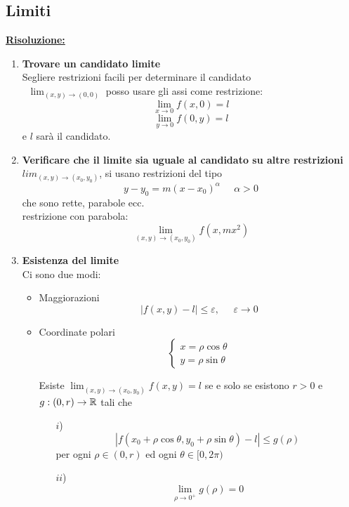 \subsection{Limiti}
\underline{\textbf{Risoluzione:}}
\begin{enumerate}
    \item \textbf{Trovare un candidato limite} \\
    Segliere restrizioni facili per determinare il candidato\\
    \es $\mspace{10mu} \lim_{(x,y) \to (0,0)}$ posso usare gli assi come restrizione:
    \[ \lim_{x \to 0} f(x,0) = l \] \[ \lim_{y \to 0} f(0, y) = l \]
    e $l$ sarà il candidato.

    \item \textbf{Verificare che il limite sia uguale al candidato su altre restrizioni}\\
    $lim_{(x,y) \to (x_0, y_0)}$, si usano restrizioni del tipo
    \[ y-y_0 = m(x-x_0)^\alpha \mspace{25mu} \alpha > 0\]
    che sono rette, parabole ecc.\\
    \es \space restrizione con parabola:
    \[ \lim_{(x,y) \to (x_0, y_0)} f(x, mx^2) \]

    \item \textbf{Esistenza del limite}\\
    Ci sono due modi:
    \begin{itemize}
        \item Maggiorazioni
        \[ |f(x, y) - l| \leq \varepsilon, \mspace{25mu} \varepsilon \to 0 \]
        \item Coordinate polari
        \[ \begin{cases}
            x = \rho \cos\theta \\
            y = \rho \sin\theta
        \end{cases}\]
        \begin{theorem}
            Esiste $\lim_{(x,y) \to (x_0, y_0)} f(x,y) = l$ se e solo se esistono $r>0$ e $g:(0, r) \to \mathbb{R}$ tali che 
            \begin{itemize}
                \item [$i$)] \[ |f(x_0 + \rho \cos \theta, y_0 + \rho \sin\theta) - l | \leq g(\rho) \]
                per ogni $\rho \in (0, r)$ ed ogni $\theta \in [0, 2\pi)$

                \item [$ii$)] \[ \lim_{\rho \to 0^+} g(\rho) = 0 \]
            \end{itemize}
        \end{theorem}
    \end{itemize}
\end{enumerate}

